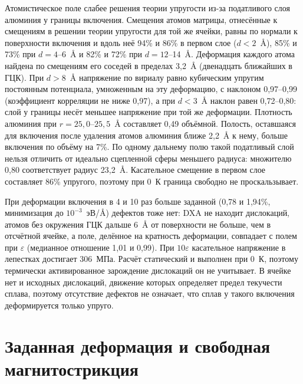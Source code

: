 \documentclass[11pt,a4paper]{article}
\begin{document}
Атомистическое поле слабее решения теории упругости из-за податливого слоя
алюминия у границы включения. Смещения атомов
матрицы, отнесённые к смещениям в решении теории упругости для той же ячейки,
равны по нормали к поверхности включения и вдоль неё 94\% и 86\%
в первом слое ($d<2$~\AA), 85\% и 73\% при $d=4$--6~\AA{}
и 82\% и 72\% при $d=12$--14~\AA. Деформация каждого атома
найдена по смещениям его соседей в пределах 3{,}2~\AA{} (двенадцать ближайших в ГЦК). При $d>8$~\AA{}
напряжение по вириалу равно кубическим упругим постоянным потенциала,
умноженным на эту деформацию, с наклоном 0{,}97--0{,}99 (коэффициент корреляции
не ниже 0{,}97), а при $d<3$~\AA{} наклон равен 0{,}72--0{,}80: слой у границы
несёт меньшее напряжение при той же деформации. Плотность алюминия при
$r=25{,}0$--$25{,}5$~\AA{} составляет 0{,}49 объёмной. Полость, оставшаяся
для включения после удаления атомов алюминия ближе 2{,}2~\AA{} к нему, больше
включения по объёму на 7\%. По одному дальнему полю такой податливый слой
нельзя отличить от идеально сцепленной сферы меньшего радиуса: множителю
0{,}80 соответствует радиус 23{,}2~\AA. Касательное смещение в первом слое
составляет 86\% упругого, поэтому при 0~К граница свободно не
проскальзывает.

При деформации включения в 4 и 10 раз больше заданной (0{,}78 и 1{,}94\%,
минимизация до $10^{-3}$~эВ/\AA) дефектов тоже нет: DXA не находит
дислокаций, атомов без окружения ГЦК дальше 6~\AA{} от поверхности не больше,
чем в отсчётной ячейке, а поле, делённое на кратность деформации, совпадает
с полем при $\varepsilon$ (медианное отношение 1{,}01 и 0{,}99). При
$10\varepsilon$ касательное напряжение в лепестках достигает 306~МПа.
Расчёт статический и выполнен при 0~К, поэтому термически активированное
зарождение дислокаций он не учитывает. В ячейке нет и исходных дислокаций,
движение которых определяет предел текучести сплава, поэтому отсутствие
дефектов не означает, что сплав у такого включения деформируется только
упруго.

\section{Заданная деформация и свободная магнитострикция}
\end{document}
